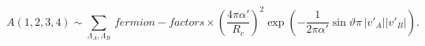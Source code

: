 \begin{equation}
A(1,2,3,4)\sim \sum _{\Lambda _{A},\Lambda _{B}}\, fermion-factors\times
\left( \frac{4\pi \alpha '}{R_{c}}\right) ^{2}\exp \left( -\frac{1}{2\pi
    \alpha '}\sin \vartheta \pi \, |v'_{A}||v'_{B}|\right) .
\end{equation}

